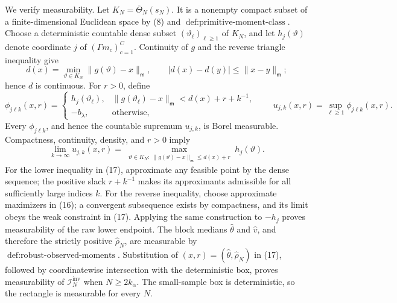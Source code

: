 We verify measurability.  Let \(K_N=\overline\Theta_N(s_N)\).  It is a nonempty compact subset of a finite-dimensional Euclidean space by (8) and \(\operatorname{def:primitive\text{-}moment\text{-}class}\).  Choose a deterministic countable dense subset \((\vartheta_\ell)_{\ell\geq1}\) of \(K_N\), and let \(h_j(\vartheta)\) denote coordinate \(j\) of \((\Gamma m_c)_{c=1}^C\).  Continuity of \(g\) and the reverse triangle inequality give
\[
 d(x)=\min_{\vartheta\in K_N}\|g(\vartheta)-x\|_{\mathsf m},
 \qquad
 |d(x)-d(y)|\leq\|x-y\|_{\mathsf m};
 \tag{15}
\]
hence \(d\) is continuous.  For \(r>0\), define
\[
 \phi_{j\ell k}(x,r)=
 \begin{cases}
 h_j(\vartheta_\ell),&
 \|g(\vartheta_\ell)-x\|_{\mathsf m}<d(x)+r+k^{-1},\\
 -b_\lambda,&\text{otherwise},
 \end{cases}
 \qquad
 u_{j,k}(x,r)=\sup_{\ell\geq1}\phi_{j\ell k}(x,r).
 \tag{16}
\]
Every \(\phi_{j\ell k}\), and hence the countable supremum \(u_{j,k}\), is Borel measurable.  Compactness, continuity, density, and \(r>0\) imply
\[
 \lim_{k\to\infty}u_{j,k}(x,r)
 =\max_{\substack{\vartheta\in K_N:\ 
 \|g(\vartheta)-x\|_{\mathsf m}\leq d(x)+r}}
 h_j(\vartheta).
 \tag{17}
\]
For the lower inequality in (17), approximate any feasible point by the dense sequence; the positive slack \(r+k^{-1}\) makes its approximants admissible for all sufficiently large indices \(k\).  For the reverse inequality, choose approximate maximizers in (16); a convergent subsequence exists by compactness, and its limit obeys the weak constraint in (17).  Applying the same construction to \(-h_j\) proves measurability of the raw lower endpoint.  The block medians \(\widehat\theta\) and \(\widehat v\), and therefore the strictly positive \(\widehat\rho_N\), are measurable by \(\operatorname{def:robust\text{-}observed\text{-}moments}\).  Substitution of \((x,r)=(\widehat\theta,\widehat\rho_N)\) in (17), followed by coordinatewise intersection with the deterministic box, proves measurability of \(\mathcal I_N^{\mathrm{inv}}\) when \(N\geq2k_\alpha\).  The small-sample box is deterministic, so the rectangle is measurable for every \(N\).

